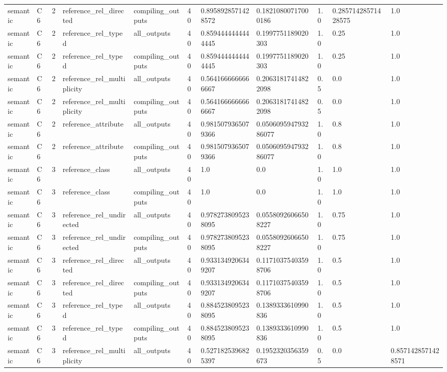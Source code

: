 \begin{tabular}{lllllllllll}
semantic & C6 & 2 & reference\_rel\_directed & compiling\_outputs & 40 & 0.8958928571428572 & 0.18210800717000186 & 1.0 & 0.28571428571428575 & 1.0 \\
semantic & C6 & 2 & reference\_rel\_typed & all\_outputs & 40 & 0.8594444444444445 & 0.1997751189020303 & 1.0 & 0.25 & 1.0 \\
semantic & C6 & 2 & reference\_rel\_typed & compiling\_outputs & 40 & 0.8594444444444445 & 0.1997751189020303 & 1.0 & 0.25 & 1.0 \\
semantic & C6 & 2 & reference\_rel\_multiplicity & all\_outputs & 40 & 0.5641666666666667 & 0.20631817414822098 & 0.5 & 0.0 & 1.0 \\
semantic & C6 & 2 & reference\_rel\_multiplicity & compiling\_outputs & 40 & 0.5641666666666667 & 0.20631817414822098 & 0.5 & 0.0 & 1.0 \\
semantic & C6 & 2 & reference\_attribute & all\_outputs & 40 & 0.9815079365079366 & 0.050609594793286077 & 1.0 & 0.8 & 1.0 \\
semantic & C6 & 2 & reference\_attribute & compiling\_outputs & 40 & 0.9815079365079366 & 0.050609594793286077 & 1.0 & 0.8 & 1.0 \\
semantic & C6 & 3 & reference\_class & all\_outputs & 40 & 1.0 & 0.0 & 1.0 & 1.0 & 1.0 \\
semantic & C6 & 3 & reference\_class & compiling\_outputs & 40 & 1.0 & 0.0 & 1.0 & 1.0 & 1.0 \\
semantic & C6 & 3 & reference\_rel\_undirected & all\_outputs & 40 & 0.9782738095238095 & 0.05580926066508227 & 1.0 & 0.75 & 1.0 \\
semantic & C6 & 3 & reference\_rel\_undirected & compiling\_outputs & 40 & 0.9782738095238095 & 0.05580926066508227 & 1.0 & 0.75 & 1.0 \\
semantic & C6 & 3 & reference\_rel\_directed & all\_outputs & 40 & 0.9331349206349207 & 0.11710375403598706 & 1.0 & 0.5 & 1.0 \\
semantic & C6 & 3 & reference\_rel\_directed & compiling\_outputs & 40 & 0.9331349206349207 & 0.11710375403598706 & 1.0 & 0.5 & 1.0 \\
semantic & C6 & 3 & reference\_rel\_typed & all\_outputs & 40 & 0.8845238095238095 & 0.1389333610990836 & 1.0 & 0.5 & 1.0 \\
semantic & C6 & 3 & reference\_rel\_typed & compiling\_outputs & 40 & 0.8845238095238095 & 0.1389333610990836 & 1.0 & 0.5 & 1.0 \\
semantic & C6 & 3 & reference\_rel\_multiplicity & all\_outputs & 40 & 0.5271825396825397 & 0.1952320356359673 & 0.5 & 0.0 & 0.8571428571428571 \\

\end{tabular}
